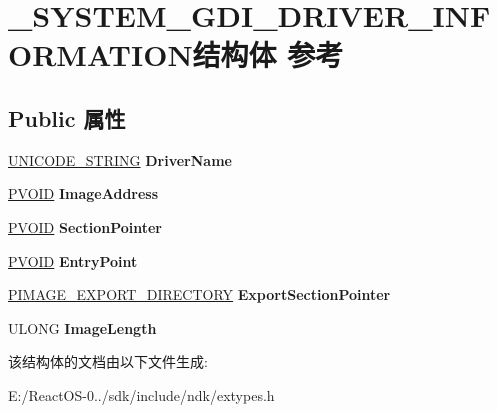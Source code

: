 \hypertarget{struct___s_y_s_t_e_m___g_d_i___d_r_i_v_e_r___i_n_f_o_r_m_a_t_i_o_n}{}\section{\+\_\+\+S\+Y\+S\+T\+E\+M\+\_\+\+G\+D\+I\+\_\+\+D\+R\+I\+V\+E\+R\+\_\+\+I\+N\+F\+O\+R\+M\+A\+T\+I\+O\+N结构体 参考}
\label{struct___s_y_s_t_e_m___g_d_i___d_r_i_v_e_r___i_n_f_o_r_m_a_t_i_o_n}
\subsection*{Public 属性}
\begin{DoxyCompactItemize}
\item 
\mbox{\label{struct___s_y_s_t_e_m___g_d_i___d_r_i_v_e_r___i_n_f_o_r_m_a_t_i_o_n_a3a396ccd250f17da28c43094ab0c4294}} 
\hyperlink{struct___u_n_i_c_o_d_e___s_t_r_i_n_g}{U\+N\+I\+C\+O\+D\+E\+\_\+\+S\+T\+R\+I\+NG} {\bfseries Driver\+Name}
\item 
\mbox{\label{struct___s_y_s_t_e_m___g_d_i___d_r_i_v_e_r___i_n_f_o_r_m_a_t_i_o_n_a5ab5ed878bdab0debe3c84fb01bd3059}} 
\hyperlink{interfacevoid}{P\+V\+O\+ID} {\bfseries Image\+Address}
\item 
\mbox{\label{struct___s_y_s_t_e_m___g_d_i___d_r_i_v_e_r___i_n_f_o_r_m_a_t_i_o_n_aaea860fb24f3fb58f48dd3453d3293df}} 
\hyperlink{interfacevoid}{P\+V\+O\+ID} {\bfseries Section\+Pointer}
\item 
\mbox{\label{struct___s_y_s_t_e_m___g_d_i___d_r_i_v_e_r___i_n_f_o_r_m_a_t_i_o_n_a56ba43b6e2b513d3e2296dd5e0715af9}} 
\hyperlink{interfacevoid}{P\+V\+O\+ID} {\bfseries Entry\+Point}
\item 
\mbox{\label{struct___s_y_s_t_e_m___g_d_i___d_r_i_v_e_r___i_n_f_o_r_m_a_t_i_o_n_ae2dc5e935060ae6edd11d636848d73c5}} 
\hyperlink{struct___i_m_a_g_e___e_x_p_o_r_t___d_i_r_e_c_t_o_r_y}{P\+I\+M\+A\+G\+E\+\_\+\+E\+X\+P\+O\+R\+T\+\_\+\+D\+I\+R\+E\+C\+T\+O\+RY} {\bfseries Export\+Section\+Pointer}
\item 
\mbox{\label{struct___s_y_s_t_e_m___g_d_i___d_r_i_v_e_r___i_n_f_o_r_m_a_t_i_o_n_a540f965dbab7d8146e380c6f447cc27e}} 
U\+L\+O\+NG {\bfseries Image\+Length}
\end{DoxyCompactItemize}


该结构体的文档由以下文件生成\+:\begin{DoxyCompactItemize}
\item 
E\+:/\+React\+O\+S-\/0../sdk/include/ndk/extypes.\+h\end{DoxyCompactItemize}

